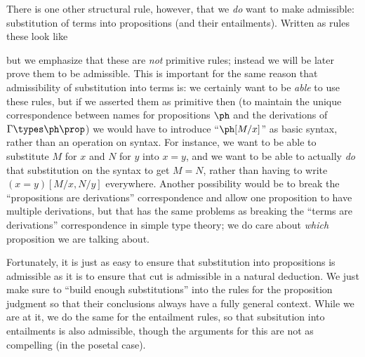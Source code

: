There is one other structural rule, however, that we \emph{do} want to make admissible: substitution of terms into propositions (and their entailments).
Written as rules these look like
but we emphasize that these are \emph{not} primitive rules; instead we will be later prove them to be admissible.
This is important for the same reason that admissibility of substitution into terms is: we certainly want to be \emph{able} to use these rules, but if we asserted them as primitive then (to maintain the unique correspondence between names for propositions $\ph$ and the derivations of $\Gamma\types \ph\prop$) we would have to introduce ``$\ph[M/x]$'' as basic syntax, rather than an operation on syntax.
For instance, we want to be able to substitute $M$ for $x$ and $N$ for $y$ into $x=y$, and we want to be able to actually \emph{do} that substitution on the syntax to get $M=N$, rather than having to write $(x=y)[M/x,N/y]$ everywhere.
Another possibility would be to break the ``propositions are derivations'' correspondence and allow one proposition to have multiple derivations, but that has the same problems as breaking the ``terms are derivations'' correspondence in simple type theory; we do care about \emph{which} proposition we are talking about.

Fortunately, it is just as easy to ensure that substitution into propositions is admissible as it is to ensure that cut is admissible in a natural deduction.
We just make sure to ``build enough substitutions'' into the rules for the proposition judgment so that their conclusions always have a fully general context.
While we are at it, we do the same for the entailment rules, so that subsitution into entailments is also admissible, though the arguments for this are not as compelling (in the posetal case).

